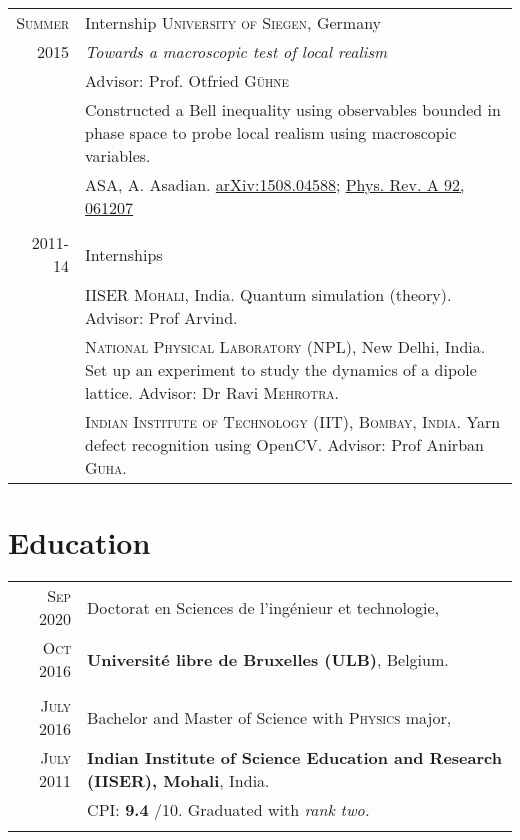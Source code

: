 \documentclass[a4paper,10pt]{article}
\begin{document}
\begin{longtable}{r|p{11cm}}
\textsc{Summer}   & Internship \textsc{University of Siegen}, Germany\\
2015                  & \emph{Towards a macroscopic test of local realism}\\
                      & \small{Advisor: Prof. Otfried \textsc{Gühne}}\\
                      & \footnotesize{Constructed a Bell inequality using observables bounded in phase space to probe local realism using macroscopic variables.} \\
                      & \small{ASA, A. Asadian. \href{https://arxiv.org/abs/1508.04588}{arXiv:1508.04588}; \href{http://dx.doi.org/10.1103/PhysRevA.92.062107}{Phys. Rev. A 92, 061207} }\\
                      
\multicolumn{2}{c}{} \\

\textsc{2011-14}  & Internships \\
                      &\textsc{IISER Mohali}, India. {\footnotesize Quantum simulation (theory).} 
                      {\footnotesize Advisor:} \small{Prof Arvind}.\\
                      &\textsc{National Physical Laboratory (NPL)}, New Delhi, India. {\footnotesize Set up an experiment to study the dynamics of a dipole lattice.}                    
                      {\footnotesize Advisor:} \small{Dr Ravi \textsc{Mehrotra}}.\\
                      &\textsc{Indian Institute of Technology (IIT), Bombay, India.} {\footnotesize Yarn defect recognition using OpenCV.}  
                      {\footnotesize Advisor:} \small{Prof Anirban \textsc{Guha}}.
\end{longtable}

\section{Education}
\begin{tabular}{rp{11cm}}	
  \textsc{Sep} 2020 & Doctorat en Sciences de l'ingénieur et technologie,\\
 \textsc{Oct} 2016  & \textbf{Université libre de Bruxelles (ULB)}, Belgium.\\
                    & \\
 \textsc{July} 2016 & Bachelor and Master of Science with \textsc{Physics} major,\\
 \textsc{July} 2011 & \textbf{Indian Institute of Science Education and Research (IISER), Mohali}, India.\\
& CPI: \textbf{9.4} /10. \small Graduated with \emph{rank two.} \\&\\ 
\end{tabular}
\end{document}
